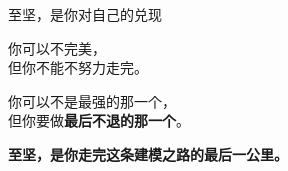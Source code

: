 \begin{frame}{\color{deepnavy}至坚，是你对自己的兑现}
\justifying
{\color{darkcharcoal}
\begin{center}
你可以不完美，\\
但你不能不努力走完。

\vspace{1em}
你可以不是最强的那一个，\\
但你要做\textbf{\color{emphasisred}最后不退的那一个}。
\end{center}

\vspace{1em}
\centering
\textbf{\color{deepnavy}至坚，是你走完这条建模之路的最后一公里。}
}
\end{frame}
